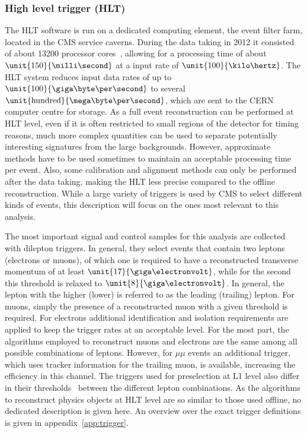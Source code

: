 \subsubsection*{High level trigger (HLT)}
The HLT software is run on a dedicated computing element, the event filter farm, located in the CMS service caverns. During the data taking in 2012 it consisted of about 13200 processor cores~\cite{HLTProceedings}, allowing for a processing time of about $\unit{150}{\milli\second}$ at a input rate of $\unit{100}{\kilo\hertz}$. The HLT system reduces input data rates of up to $\unit{100}{\giga\byte\per\second}$ to several $\unit{\text{hundred}}{\mega\byte\per\second}$, which are sent to the CERN computer centre for storage. As a full event reconstruction can be performed at HLT level, even if it is often restricted to small regions of the detector for timing reasons, much more complex quantities can be used to separate potentially interesting signatures from the large backgrounds. However, approximate methods have to be used sometimes to maintain an acceptable processing time per event. Also, some calibration and alignment methods can only be performed after the data taking, making the HLT less precise compared to the offline reconstruction. While a large variety of triggers is used by CMS to select different kinds of events, this description will focus on the ones most relevant to this analysis. 

The most important signal and control samples for this analysis are collected with dilepton triggers. In general, they select events that contain two leptons (electrons or muons), of which one is required to have a reconstructed transverse momentum \pt of at least $\unit{17}{\giga\electronvolt}$, while for the second this threshold is relaxed to $\unit{8}{\giga\electronvolt}$. In general, the lepton with the higher (lower) \pt is referred to as the leading (trailing) lepton.  For muons, simply the presence of a reconstructed muon with a given \pt threshold is required. For electrons additional identification and isolation requirements are applied to keep the trigger rates at an acceptable level. For the most part, the algorithms employed to reconstruct muons and electrons are the same among all possible combinations of leptons. However, for $\mu\mu$ events an additional trigger, which uses tracker information for the trailing muon, is available, increasing the efficiency in this channel. The triggers used for preselection at L1 level also differ in their thresholds~\cite{HLTConfigBrowser} between the different lepton combinations. As the algorithms to reconstruct physics objects at HLT level are so similar to those used offline, no dedicated description is given here. An overview over the exact trigger definitions is given in appendix~\ref{app:trigger}.

